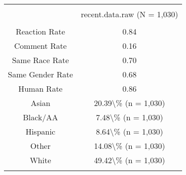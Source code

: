 
\begin{table}[!htbp] \centering 
  \caption{} 
  \label{} 
\begin{tabular}{@{\extracolsep{5pt}} cc} 
\\[-1.8ex]\hline 
\hline \\[-1.8ex] 
 & recent.data.raw (N = 1,030) \\ 
\hline \\[-1.8ex] 
Reaction Rate & 0.84 \\ 
Comment Rate & 0.16 \\ 
Same Race Rate & 0.70 \\ 
Same Gender Rate & 0.68 \\ 
Human Rate & 0.86 \\ 
Asian & 20.39\textbackslash \% (n = 1,030) \\ 
Black/AA & 7.48\textbackslash \% (n = 1,030) \\ 
Hispanic & 8.64\textbackslash \% (n = 1,030) \\ 
Other & 14.08\textbackslash \% (n = 1,030) \\ 
White & 49.42\textbackslash \% (n = 1,030) \\ 
\hline \\[-1.8ex] 
\end{tabular} 
\end{table} 
